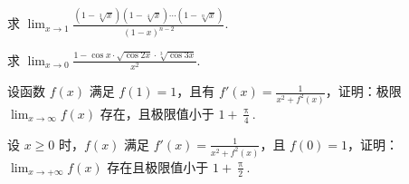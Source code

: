 	\begin{ti}
		求 $\lim_{x \to 1} \frac{\left( 1 - \sqrt[3]{x} \right) \left( 1 - \sqrt[4]{x} \right) \cdots \left( 1 - \sqrt[n]{x} \right) }{(1 - x)^{n-2}}$.
	\end{ti}
	
	\begin{ti}
		求 $\lim_{x \to 0} \frac{1 - \cos x \cdot \sqrt{\cos 2x} \cdot \sqrt[3]{\cos 3x}}{x^{2}}$.
	\end{ti}

	\begin{ti}
		设函数 $f(x)$ 满足 $f(1) = 1$，且有 $f'(x) = \frac{1}{x^{2} + f^{2}(x)}$，证明：极限 $\lim_{x \to \infty} f(x)$ 存在，且极限值小于 $1 + \frac{\uppi}{4}$.
	\end{ti}

	\begin{ti}
		设 $x \geq 0$ 时，$f(x)$ 满足 $f'(x) = \frac{1}{x^{2} + f^{2}(x)}$，且 $f(0) = 1$，证明：$\lim_{x \to +\infty} f(x)$ 存在且极限值小于 $1 + \frac{\uppi}{2}$.
	\end{ti}